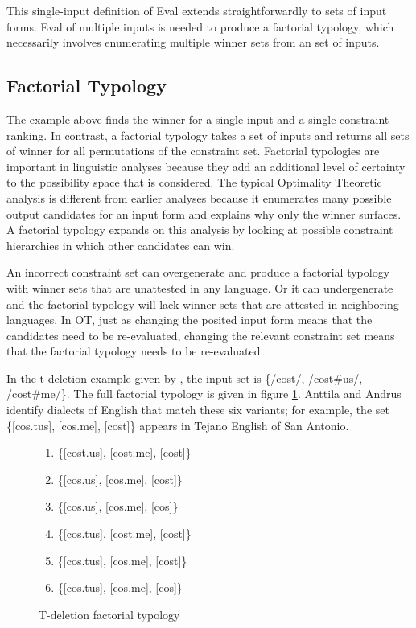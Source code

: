 \documentclass[11pt]{article}
\begin{document}
This single-input definition of {\sc Eval} extends straightforwardly
to sets of input forms. {\sc Eval} of multiple inputs is needed to
produce a factorial typology, which necessarily involves enumerating
multiple winner sets from an set of inputs.

\subsection{Factorial Typology}

The example above finds the winner for a single input and a single
constraint ranking. In contrast, a factorial typology takes a set of
inputs and returns all sets of winner for all permutations of the
constraint set. Factorial typologies are important in linguistic
analyses because they add an additional level of certainty to the
possibility space that is considered.  The typical Optimality
Theoretic analysis is different from earlier analyses because it
enumerates many possible output candidates for an input form and
explains why only the winner surfaces.  A factorial typology expands
on this analysis by looking at possible constraint hierarchies in which other
candidates can win.

An incorrect constraint set can overgenerate and produce a factorial
typology with winner sets that are unattested in any language. Or it
can undergenerate and the factorial typology will lack winner sets
that are attested in neighboring languages. In OT, just as changing the
posited input form means that the candidates need to be re-evaluated,
changing the relevant constraint set means that the factorial typology
needs to be re-evaluated.

In the t-deletion example given by
, the input set is \{/cost/, /cost\#us/,
/cost\#me/\}. The full factorial typology is given in figure
\ref{cost-typology}. Anttila and Andrus identify
dialects of English that match these six variants; for example, the
set \{[cos.tus], [cos.me], [cost]\} appears in Tejano English of San
Antonio.

\begin{figure}
  \begin{enumerate}
    \item \{[cost.us], [cost.me], [cost]\}
    \item \{[cos.us], [cos.me], [cost]\}
    \item \{[cos.us], [cos.me], [cos]\}
    \item \{[cos.tus], [cost.me], [cost]\}
    \item \{[cos.tus], [cos.me], [cost]\}
    \item \{[cos.tus], [cos.me], [cos]\}
  \end{enumerate}
  \caption{T-deletion factorial typology}
  \label{cost-typology}
\end{figure}
\end{document}
